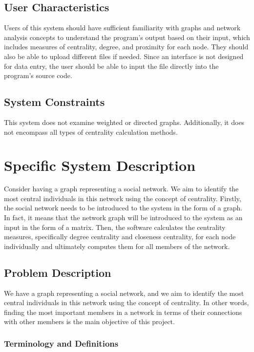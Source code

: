 \documentclass[12pt]{article}
\begin{document}
\subsection{User Characteristics} \label{SecUserCharacteristics}
Users of this system should have sufficient familiarity with graphs and network analysis concepts to understand the program's output based on their input, which includes measures of centrality, degree, and proximity for each node. They should also be able to upload different files if needed. Since an interface is not designed for data entry, the user should be able to input the file directly into the program's source code.

\subsection{System Constraints}


This system does not examine weighted or directed graphs. Additionally, it does not encompass all types of centrality calculation methods.

\section{Specific System Description}

Consider having a graph representing a social network. We aim to identify the most central individuals in this network using the concept of centrality. Firstly, the social network needs to be introduced to the system in the form of a graph. In fact, it means that the network graph will be introduced to the system as an input in the form of a matrix. Then, the software calculates the centrality measures, specifically degree centrality and closeness centrality, for each node individually and ultimately computes them for all members of the network.

\subsection{Problem Description} \label{Sec_pd}

We have a graph representing a social network, and we aim to identify the most central individuals in this network using the concept of centrality. In other words, finding the most important members in a network in terms of their connections with other members is the main objective of this project.

\subsubsection{Terminology and  Definitions}
\end{document}
